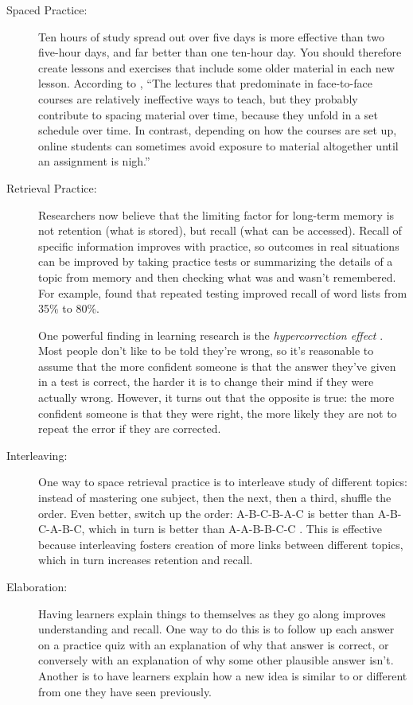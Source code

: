 \documentclass[10pt,letterpaper]{article}
\begin{document}
\begin{description}

\item[Spaced Practice:] Ten hours of study spread out over five days is more
  effective than two five-hour days, and far better than one ten-hour day. You
  should therefore create lessons and exercises that include some older material
  in each new lesson.  According to \cite{Mill2016}, ``The lectures that
  predominate in face-to-face courses are relatively ineffective ways to teach,
  but they probably contribute to spacing material over time, because they
  unfold in a set schedule over time.  In contrast, depending on how the courses
  are set up, online students can sometimes avoid exposure to material
  altogether until an assignment is nigh.''

\item[Retrieval Practice:] Researchers now believe that the limiting factor for
  long-term memory is not retention (what is stored), but recall (what can be
  accessed).  Recall of specific information improves with practice, so outcomes
  in real situations can be improved by taking practice tests or summarizing the
  details of a topic from memory and then checking what was and wasn't
  remembered. For example, \cite{Karp2008} found that repeated testing improved
  recall of word lists from 35\% to 80\%.

  One powerful finding in learning research is the \emph{hypercorrection effect}
  \cite{Metc2016}. Most people don't like to be told they're wrong, so it's
  reasonable to assume that the more confident someone is that the answer
  they've given in a test is correct, the harder it is to change their mind if
  they were actually wrong. However, it turns out that the opposite is true: the
  more confident someone is that they were right, the more likely they are not
  to repeat the error if they are corrected.

\item[Interleaving:] One way to space retrieval practice is to interleave study
  of different topics: instead of mastering one subject, then the next, then a
  third, shuffle the order. Even better, switch up the order: A-B-C-B-A-C is
  better than A-B-C-A-B-C, which in turn is better than A-A-B-B-C-C
  \cite{Rohr2015}. This is effective because interleaving fosters creation of
  more links between different topics, which in turn increases retention and
  recall.

\item[Elaboration:] Having learners explain things to themselves as they go
  along improves understanding and recall. One way to do this is to follow up
  each answer on a practice quiz with an explanation of why that answer is
  correct, or conversely with an explanation of why some other plausible answer
  isn't. Another is to have learners explain how a new idea is similar to or
  different from one they have seen previously.


\end{description}
\end{document}
